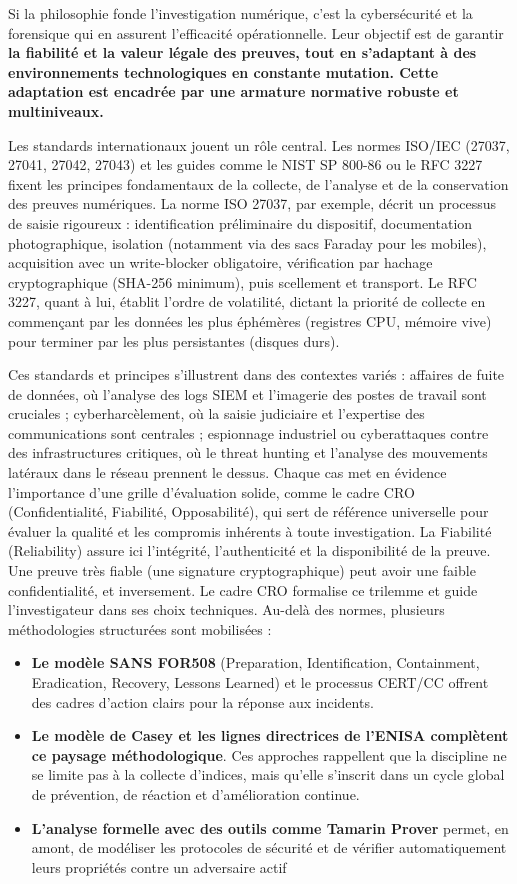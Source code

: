 \documentclass[12pt,a4paper]{report}
\begin{document}
{		Si la philosophie fonde l’investigation numérique, c’est la cybersécurité et la forensique qui en assurent l’efficacité opérationnelle. Leur objectif est de garantir \textbf{la fiabilité et la valeur légale des preuves, tout en s’adaptant à des environnements technologiques en constante mutation. Cette adaptation est encadrée par une armature normative robuste et multiniveaux.}
		
		Les standards internationaux jouent un rôle central. Les normes ISO/IEC (27037, 27041, 27042, 27043) et les guides comme le NIST SP 800-86 ou le RFC 3227 fixent les principes fondamentaux de la collecte, de l’analyse et de la conservation des preuves numériques. La norme ISO 27037, par exemple, décrit un processus de saisie rigoureux : identification préliminaire du dispositif, documentation photographique, isolation (notamment via des sacs Faraday pour les mobiles), acquisition avec un write-blocker obligatoire, vérification par hachage cryptographique (SHA-256 minimum), puis scellement et transport. Le RFC 3227, quant à lui, établit l’ordre de volatilité, dictant la priorité de collecte en commençant par les données les plus éphémères (registres CPU, mémoire vive) pour terminer par les plus persistantes (disques durs).
		
		Ces standards et principes s’illustrent dans des contextes variés : affaires de fuite de données, où l’analyse des logs SIEM et l’imagerie des postes de travail sont cruciales ; cyberharcèlement, où la saisie judiciaire et l’expertise des communications sont centrales ; espionnage industriel ou cyberattaques contre des infrastructures critiques, où le threat hunting et l’analyse des mouvements latéraux dans le réseau prennent le dessus. Chaque cas met en évidence l’importance d’une grille d’évaluation solide, comme le cadre CRO (Confidentialité, Fiabilité, Opposabilité), qui sert de référence universelle pour évaluer la qualité et les compromis inhérents à toute investigation. La Fiabilité (Reliability) assure ici l'intégrité, l'authenticité et la disponibilité de la preuve. Une preuve très fiable (une signature cryptographique) peut avoir une faible confidentialité, et inversement. Le cadre CRO formalise ce trilemme et guide l’investigateur dans ses choix techniques.
		Au-delà des normes, plusieurs méthodologies structurées sont mobilisées : 
		\begin{itemize}
			\item \textbf{Le modèle SANS FOR508} (Preparation, Identification, Containment, Eradication, Recovery, Lessons Learned) et le processus CERT/CC offrent des cadres d’action clairs pour la réponse aux incidents. 
			\item \textbf{Le modèle de Casey et les lignes directrices de l’ENISA complètent ce paysage méthodologique}. Ces approches rappellent que la discipline ne se limite pas à la collecte d’indices, mais qu’elle s’inscrit dans un cycle global de prévention, de réaction et d’amélioration continue. 
			\item \textbf{L’analyse formelle avec des outils comme Tamarin Prover} permet, en amont, de modéliser les protocoles de sécurité et de vérifier automatiquement leurs propriétés contre un adversaire actif 
		\end{itemize}
		
}
\end{document}
